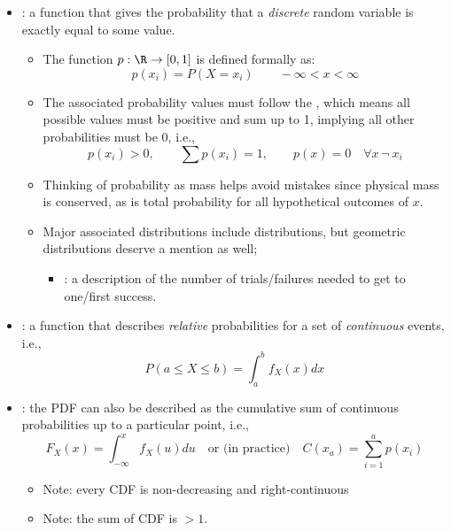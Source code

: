 \begin{itemize}
\begin{itemize}
    \item {}: a function that gives the probability that a \emph{discrete} random variable  is exactly equal to some value. 
    \begin{itemize}
      \item The function \(p:\R \rightarrow [0,1]\) is defined formally as:
      \[%
      p(x_i)=P(X=x_i) \qquad -\infty<x<\infty
      \]%
      \item The associated probability values must follow the \hyperref[Subsection: Probability Theory Axioms]{}, which means all possible values must be positive and sum up to 1, implying all other probabilities must be 0, i.e., 
      \[%
      p(x_i) > 0,\qquad
      \sum p(x_i)=1,\qquad
      p(x) = 0 \quad \forall x \,\neg ~x_i
      \]%
      \item Thinking of probability as mass helps avoid mistakes since physical mass is conserved, as is total probability for all hypothetical outcomes of \(x\).
      \item Major associated distributions include \hyperref[Subsection: Primer: Probability Distributions]{} distributions, but geometric distributions deserve a mention as well;
        \begin{itemize}
          \item {}: a description of the number of trials/failures needed to get to one/first success.
        \end{itemize}
    \end{itemize}
    \item {}: a function that describes \emph{relative} probabilities for a set of \hyperref[Subsection: Independent and Mutually Exclusive Events]{} \emph{continuous} events, i.e.,
    \[%
    P(a\leq X \leq b) = \int_a^b f_X(x)dx
    \]%
    \item {}: the PDF can also be described as the cumulative sum of continuous probabilities up to a particular point, i.e., 
    \[%
    F_X(x) = \int_{-\infty}^x f_X(u)du \quad \text{or (in practice)}\quad
    C(x_a) = \sum_{i = 1}^{a} p(x_i)
    \]%
    \begin{itemize}
      \item Note: every CDF is non-decreasing and right-continuous 
      \item Note: the sum of CDF is \(> 1\).
    \end{itemize}
  \end{itemize}
\end{itemize}

